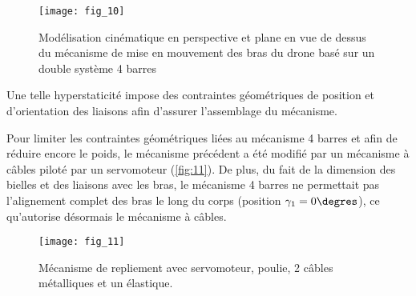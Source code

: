 \begin{figure}[H]
\centering
\texttt{[image: fig\_10]}
\caption{\label{fig:10} Modélisation cinématique en perspective et plane en vue de dessus du mécanisme de mise en mouvement des bras du drone basé sur un double système 4 barres}
\end{figure}

\ifprof
\begin{corrige}
\end{corrige}
\else
\fi

Une telle hyperstaticité impose des contraintes géométriques de position et d’orientation des
liaisons afin d’assurer l’assemblage du mécanisme.

\ifprof
\begin{corrige}
\end{corrige}
\else
\fi

\ifprof
\begin{corrige}
\end{corrige}
\else
\fi

Pour limiter les contraintes géométriques liées au mécanisme 4 barres et afin de réduire
encore le poids, le mécanisme précédent a été modifié par un mécanisme à câbles piloté
par un servomoteur (\autoref{fig:11}). De plus, du fait de la dimension des bielles et des liaisons
avec les bras, le mécanisme 4 barres ne permettait pas l’alignement complet des bras le
long du corps (position $\gamma_1 = 0\degres$), ce qu’autorise désormais le mécanisme à câbles.

\begin{figure}[H]
\centering
\texttt{[image: fig\_11]}
\caption{\label{fig:11} Mécanisme de repliement avec servomoteur, poulie, 2 câbles métalliques et un
élastique.}
\end{figure}


